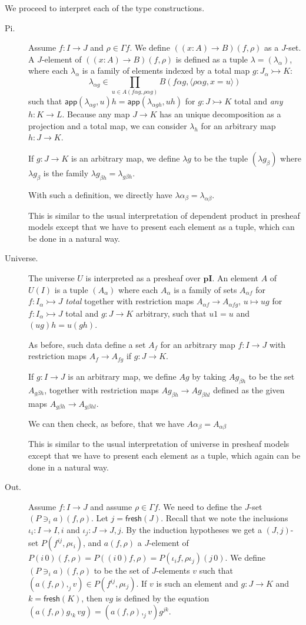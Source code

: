 \documentclass[english]{PaperTools/latex/lipics}
\newcommand\op[1]{∋_{#1}}
\def\pI{\ensuremath{\mathbf{pI}}}
\def\fresh#1{\mathsf{fresh}(#1)}
\def\app#1#2{\mathsf{app}(#1,#2)}
\begin{document}
\bigskip
We proceed to interpret each of the type constructions.
\begin{description}
  \item[\sc Pi.]
    Assume $f : I → J$ and $ρ ∈ Γf$. We define $((x:A) → B)(f,ρ)$ as a $J$-set.
    A $J$-element of $((x:A) → B)(f,ρ)$ is defined as a tuple $λ = (λ_α)$,
    where each $λ_α$ is a family of elements indexed by a total map $g : J_α ↣ K$:
    $$λ_{α g} ∈ \prod_{u ∈ A(fα g,ραg)} B(fαg,⟨ραg,x=u⟩)$$
    such that
    $\app{λ_{αg}}{u} h = \app{λ_{α gh}}{uh}$ for $g : J ↣ K$ total and \emph{any} $h : K → L$.
    Because any map $J → K$ has an unique decomposition as a projection and a total
    map, we can consider $λ_h$ for an arbitrary map $h : J → K$.

    If $g : J → K$ is an arbitrary map, we define $λ g$ to be the tuple
    $(λ g_β)$ where $λ g_β$ is the family $λ g_{βh} = λ_{gβh}$.

    With such a definition, we directly have $λα_{β} = λ_{αβ}$.

    This is similar to the usual interpretation of dependent product in
    presheaf models \citep{Hofmann97syntaxand,bezem2014model} except that we
    have to present each element as a tuple, which can be done in a natural way.


  \item[\sc Universe.]
    The universe $U$ is interpreted as a presheaf over \pI. An element $A$ of
    $U(I)$ is a tuple $(A_α)$ where each $A_α$ is a family of sets
    $A_{α f}$ for $f : I_α ↣ J$ \emph{total} together with restriction
    maps $A_{α f} → A_{α fg}$, $u ↦ ug$ for $f : I_α ↣ J$ total
    and $g : J → K$ arbitrary, such that $u1 = u$ and $(ug)h = u(gh)$.

    As before, such data define a set $A_f$ for an arbitrary map $f : I → J$
    with restriction maps $A_f → A_{fg}$ if $g : J → K$.

    If $g : I → J$ is an arbitrary map, we define $Ag$ by taking $Ag_{βh}$
    to be the set $A_{gβh}$, together with restriction maps $Ag_{βh} → Ag_{βhl}$
    defined as the given maps $A_{gβh} → A_{gβhl}$.

    We can then check, as before, that we have $Aα_{β} = A_{αβ}$

    This is similar to the usual interpretation of universe in
    presheaf models \citep{Hofmann97syntaxand,bezem2014model} except that we
    have to present each element as a tuple, which again can be done in a natural way.


  \item[\sc Out.]
    Assume $f : I → J$ and assume $ρ ∈ Γf$.  We need to define the $J$-set $(P \op {i} a)(f,ρ)$.
    Let $j = \fresh J$.
    Recall that we note the inclusions $ι_i : I → I,i$ and $ι_j : J → J,j$.
    By the induction hypotheses we get a $(J,j)$-set $P(f^{ij},ρι_i)$, and $a(f,ρ)$
    a $J$-element of $P(i\,0)(f,ρ) = P((i\,0)f,ρ) = P(ι_i f,ρι_j)(j\,0)$.
    We define $(P \op {i} a)(f,ρ)$ to be the set of $J$-elements $v$ such that
    $(a(f,ρ),_j v) ∈ P(f^{ij},ρι_j)$. If $v$ is such an element and $g : J → K$
    and $k=\fresh K$, then $vg$ is defined by the equation
    $(a(f,ρ)g,_k vg) = (a(f,ρ) ,_j v) g^{jk}$.



\end{description}
\end{document}
